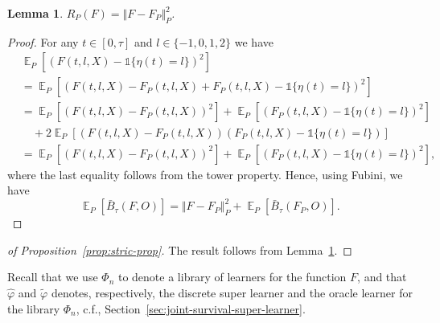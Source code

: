 \documentclass[a4paper,danish]{article}
\DeclareMathOperator{\E}{\mathbb{E}} %
\renewcommand{\phi}{\varphi}
\newcommand{\1}{\mathds{1}}
\theoremstyle{plain} %
\numberwithin{theorem}{section}
\newtheorem{lemma}[theorem]{Lemma}
\theoremstyle{definition} %
\theoremstyle{remark}
\begin{document}
\begin{lemma}
  \label{lemma:norm}
  \( R_{P}(F) = \Vert F - F_P \Vert_{P}^2 \).
\end{lemma}
\begin{proof}
  For any \( t \in [0, \tau] \) and \( l\in \{-1,0,1,2\} \) we have
  \begin{align*}
    & \E_{P}{\left[ (F(t, l, X) - \1{\{\eta(t) = l \}})^2 \right]}
    \\
    & =    \E_{P}{\left[ (F(t, l, X) - F_P(t, l, X) + F_P(t, l, X) - \1{\{\eta(t) = l
      \}})^2 \right]}
    \\
    & =    \E_{P}{\left[ (F(t, l, X) - F_P(t, l, X))^2\right]}
      + \E_{P}{\left[ (F_P(t, l, X) - \1{\{\eta(t) = l \}})^2\right]}
    \\
    & \quad
      + 2\E_{P}{\left[ (F(t, l, X) - F_P(t, l, X))(F_P(t, l, X) - \1{\{\eta(t) = l
      \}})\right]}
    \\
    & =    \E_{P}{\left[ (F(t, l, X) - F_P(t, l, X))^2\right]}
      + \E_{P}{\left[ (F_P(t, l, X) - \1{\{\eta(t) = l \}})^2\right]},
  \end{align*}
  where the last equality follows from the tower property. Hence, using Fubini,
  we have
  \begin{equation*}
    \E_P{[\bar{B}_{\tau}(F, O)]}
    = \Vert F - F_P \Vert_{P}^2 + \E_P{[\bar{B}_{\tau}(F_P, O)]}.
  \end{equation*}
\end{proof}

\begin{proof}[of Proposition~\ref{prop:stric-prop}]
  The result follows from Lemma~\ref{lemma:norm}.
\end{proof}

Recall that we use \( \Phi_n \) to denote a library of learners for the
function \( F \), and that \( \hat{\phi} \) and \( \tilde{\phi} \) denotes,
respectively, the discrete super learner and the oracle learner for the library
\( \Phi_n \), c.f., Section~\ref{sec:joint-survival-super-learner}.
\end{document}
